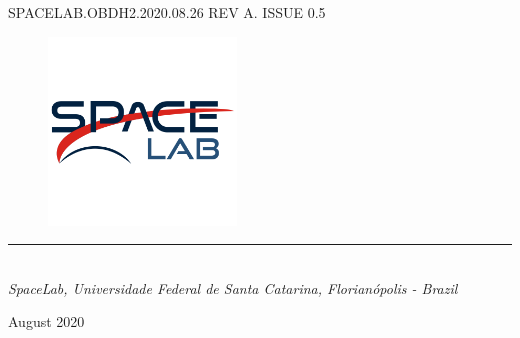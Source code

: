 %
%
%
%
%

%
%
%
%
%
%

\begin{titlepage}

\thispagestyle{empty}

\begin{flushleft}
SPACELAB.OBDH2.2020.08.26 REV A. ISSUE 0.5
\end{flushleft}

\begin{figure}[!ht]
    \begin{flushleft}
        \includegraphics[width=5cm]{figures/spacelab.png}
    \end{flushleft}
\end{figure}

\begin{flushleft}
\Huge{\textbf{\thetitle}}
\rule[0pt]{\textwidth}{5pt}
\end{flushleft}

\vspace{0.2cm}

\begin{flushleft}
\textit{\thetitle} \\
\textit{SpaceLab, Universidade Federal de Santa Catarina, Florianópolis - Brazil}
\end{flushleft}

\vfill
\vfill

\begin{flushright}
August 2020
\end{flushright}

\end{titlepage}
